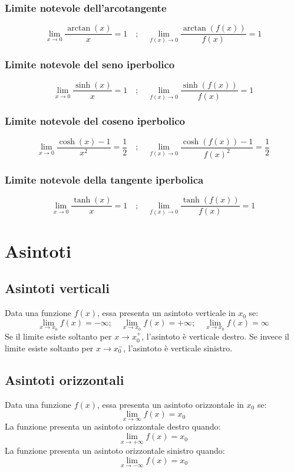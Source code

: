 \documentclass[a4paper,14pt]{extarticle}
\begin{document}
\subsubsection{Limite notevole dell'arcotangente}
\[ \lim_{x \to 0}\frac{\arctan{(x)}}{x} = 1 \quad;\quad \lim_{f(x) \to 0}\frac{\arctan{(f(x))}}{f(x)} = 1 \]

\subsubsection{Limite notevole del seno iperbolico}
\[ \lim_{x \to 0}\frac{\sinh{(x)}}{x} = 1 \quad;\quad \lim_{f(x) \to 0}\frac{\sinh{(f(x))}}{f(x)} = 1 \]

\subsubsection{Limite notevole del coseno iperbolico}
\[ \lim_{x \to 0}\frac{\cosh{(x)} - 1}{x^2} = \frac{1}{2} \quad;\quad \lim_{f(x) \to 0}\frac{\cosh{(f(x))} - 1}{f(x)^2} = \frac{1}{2} \]

\subsubsection{Limite notevole della tangente iperbolica }
\[ \lim_{x \to 0}\frac{\tanh{(x)}}{x} = 1 \quad;\quad \lim_{f(x) \to 0}\frac{\tanh{(f(x))}}{f(x)} = 1 \]

\section{Asintoti}
\subsection{Asintoti verticali}
Data una funzione $f(x)$, essa presenta un asintoto verticale in $x_0$ se:
\large
\[\lim_{x\to x_0} f(x) = -\infty ;\quad \lim_{x\to x_0} f(x) = +\infty ;\quad \lim_{x\to x_0} f(x) = \infty \]
\normalsize
Se il limite esiste soltanto per $x \to x_0^+$, l'asintoto è verticale destro. Se invece il limite esiste soltanto per $x \to x_0^-$, l'asintoto è verticale sinistro.
\subsection{Asintoti orizzontali}
Data una funzione $f(x)$, essa presenta un asintoto orizzontale in $x_0$ se:
\large \[\lim_{x\to \infty} f(x) = x_0 \] \normalsize
La funzione presenta un asintoto orizzontale destro quando:
\large \[ \lim_{x\to +\infty} f(x) = x_0 \] \normalsize
La funzione presenta un asintoto orizzontale sinistro quando:
\large \[ \lim_{x\to -\infty} f(x) = x_0 \] \normalsize
\end{document}
